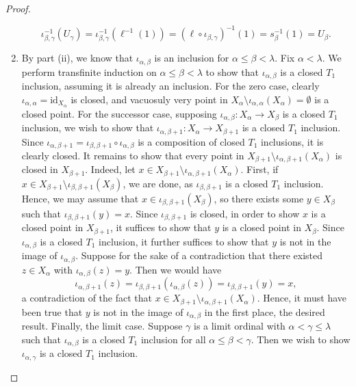 \documentclass{amsart}
\theoremstyle{plain}
\theoremstyle{definition}
\newcommand{\0}{\mathbf{0}}
\newcommand{\id}{\mathrm{id}}
\renewcommand{\(}{\left(}
\renewcommand{\)}{\right)}
\begin{document}
\begin{proof}
\begin{enumerate}[label=(\roman*),listparindent=\parindent,parsep=0pt]
    \[\iota_{\beta,\gamma}^{-1}(U_\gamma)=\iota_{\beta,\gamma}^{-1}(\ell^{-1}(1))=(\ell\circ\iota_{\beta,\gamma})^{-1}(1)=s_\beta^{-1}(1)=U_\beta.\]
    \item By part (ii), we know that $\iota_{\alpha,\beta}$ is an inclusion for $\alpha\leq\beta<\lambda$. Fix $\alpha<\lambda$. We perform transfinite induction on $\alpha\leq\beta<\lambda$ to show that $\iota_{\alpha,\beta}$ is a closed $T_1$ inclusion, assuming it is already an inclusion. For the zero case, clearly $\iota_{\alpha,\alpha}=\id_{X_\alpha}$ is closed, and vacuosuly very point in $X_\alpha\setminus\iota_{\alpha,\alpha}(X_\alpha)=\emptyset$ is a closed point. For the successor case, supposing $\iota_{\alpha,\beta}:X_\alpha\to X_\beta$ is a closed $T_1$ inclusion, we wish to show that $\iota_{\alpha,\beta+1}:X_\alpha\to X_{\beta+1}$ is a closed $T_1$ inclusion. Since $\iota_{\alpha,\beta+1}=\iota_{\beta,\beta+1}\circ\iota_{\alpha,\beta}$ is a composition of closed $T_1$ inclusions, it is clearly closed. It remains to show that every point in $X_{\beta+1}\setminus\iota_{\alpha,\beta+1}(X_\alpha)$ is closed in $X_{\beta+1}$. Indeed, let $x\in X_{\beta+1}\setminus\iota_{\alpha,\beta+1}(X_\alpha)$. First, if $x\in X_{\beta+1}\setminus\iota_{\beta,\beta+1}(X_\beta)$, we are done, as $\iota_{\beta,\beta+1}$ is a closed $T_1$ inclusion. Hence, we may assume that $x\in\iota_{\beta,\beta+1}(X_\beta)$, so there exists some $y\in X_\beta$ such that $\iota_{\beta,\beta+1}(y)=x$. Since $\iota_{\beta,\beta+1}$ is closed, in order to show $x$ is a closed point in $X_{\beta+1}$, it suffices to show that $y$ is a closed point in $X_\beta$. Since $\iota_{\alpha,\beta}$ is a closed $T_1$ inclusion, it further suffices to show that $y$ is not in the image of $\iota_{\alpha,\beta}$. Suppose for the sake of a contradiction that there existed $z\in X_\alpha$ with $\iota_{\alpha,\beta}(z)=y$. Then we would have
    \[\iota_{\alpha,\beta+1}(z)=\iota_{\beta,\beta+1}(\iota_{\alpha,\beta}(z))=\iota_{\beta,\beta+1}(y)=x,\]
    a contradiction of the fact that $x\in X_{\beta+1}\setminus\iota_{\alpha,\beta+1}(X_\alpha)$. Hence, it must have been true that $y$ is not in the image of $\iota_{\alpha,\beta}$ in the first place, the desired result. Finally, the limit case. Suppose $\gamma$ is a limit ordinal with $\alpha<\gamma\leq\lambda$ such that $\iota_{\alpha,\beta}$ is a closed $T_1$ inclusion for all $\alpha\leq\beta<\gamma$. Then we wish to show $\iota_{\alpha,\gamma}$ is a closed $T_1$ inclusion.


\end{enumerate}
\end{proof}
\end{document}
